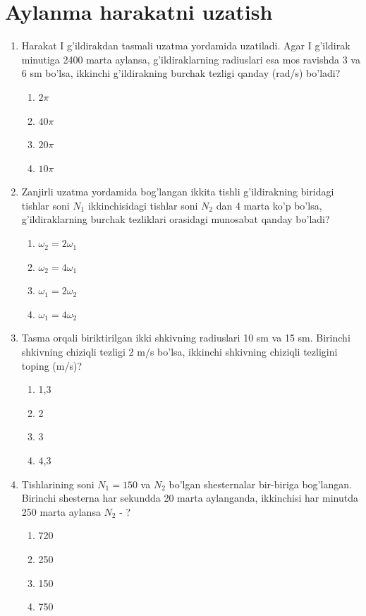 \section{Aylanma harakatni uzatish}

\begin{enumerate}

\item Harakat I g'ildirakdan tasmali uzatma yordamida uzatiladi. Agar I g'ildirak minutiga 2400 marta aylansa, g'ildiraklarning radiuslari esa mos ravishda 3 va 6 sm bo'lsa, ikkinchi g'ildirakning burchak tezligi qanday (rad/s) bo'ladi?
\begin{enumerate}[label=\Alph*)]
\item $2\pi$
\item $40\pi$
\item $20\pi$
\item $10\pi$
\end{enumerate}

\item Zanjirli uzatma yordamida bog'langan ikkita tishli g'ildirakning biridagi tishlar soni $N_1$ ikkinchisidagi tishlar soni $N_2$ dan 4 marta ko'p bo'lsa, g'ildiraklarning burchak tezliklari orasidagi munosabat qanday bo'ladi?
\begin{enumerate}[label=\Alph*)]
\item $\omega_2 = 2\omega_1$
\item $\omega_2 = 4\omega_1$
\item $\omega_1 = 2\omega_2$
\item $\omega_1 = 4\omega_2$
\end{enumerate}

\item Tasma orqali biriktirilgan ikki shkivning radiuslari 10 sm va 15 sm. Birinchi shkivning chiziqli tezligi 2 m/s bo'lsa, ikkinchi shkivning chiziqli tezligini toping (m/s)?
\begin{enumerate}[label=\Alph*)]
\item 1,3
\item 2
\item 3
\item 4,3
\end{enumerate}

\item Tishlarining soni $N_1 = 150$ va $N_2$ bo'lgan shesternalar bir-biriga bog'langan. Birinchi shesterna har sekundda 20 marta aylanganda, ikkinchisi har minutda 250 marta aylansa $N_2$ - ?
\begin{enumerate}[label=\Alph*)]
\item 720
\item 250
\item 150
\item 750
\end{enumerate}


\end{enumerate}
